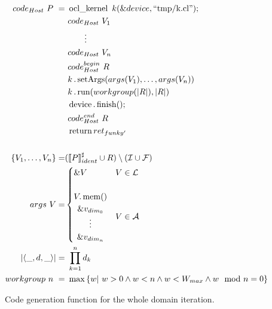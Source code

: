 \begin{figure}
	\begin{align}
		\label{eq:compiler_code_whole}
		code_{Host}\ P\ = 	&\ \operatorname{ocl\_kernel}\ k( \& device, \text{``tmp/k.cl''});\\
							&\ code_{Host}\ V_1 \notag \\
							&\ \qquad \vdots \notag \\
							&\ code_{Host}\ V_n \notag \\
							&\ code_{Host}^{begin}\ R \notag \\
							&\ k\operatorname{.setArgs}(args(V_1),\dotsc, args(V_n))\notag\\
							&\ k\operatorname{.run}(workgroup(|R|), |R|)\notag\\
							&\ \operatorname{device}.\operatorname{finish}();\notag\\
							&\ code_{Host}^{end}\ R \notag \\
							&\ \operatorname{return} ret_{funky'} \notag \\
							&\ \notag \\
		\label{eq:compiler_code_whole_idents}
		\left\{V_1, \dotsc, V_n \right\} = &(\abstsyntax{P}_{ident} \cup R) \setminus (\mathcal{I}\cup \mathcal{F})\\
		\label{eq:compiler_code_whole_args}
		args\ V = & 	\begin{cases} 
						\&V & V \in \mathcal{L} \\
						\quad\\
						\begin{matrix}	
							V.\operatorname{mem}()\\
							\&v_{dim_0} \\
							\vdots\\
							\&v_{dim_n} 
						\end{matrix} & V \in \mathcal{A}
					\end{cases} \\
		\label{eq:compiler_code_whole_workgroup}
		\left|\langle \_, d, \_\rangle\right| =	&\ \prod_{k=1}^n d_k \\
		workgroup\ n\ = &\ \operatorname{max}\left\{w |\ w > 0 \wedge w < n \wedge w < W_{max} \wedge w\mod n = 0 \right\} 
	\end{align}
	\caption{Code generation function for the whole domain iteration.}
\end{figure}
\newpage



